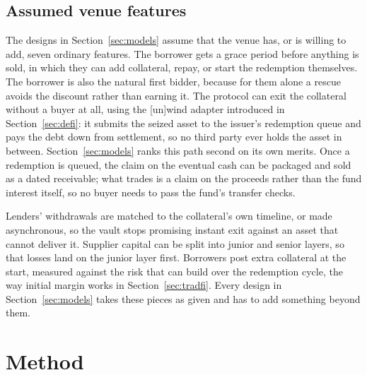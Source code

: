 \documentclass[11pt,a4paper]{article}
\begin{document}
\subsection{Assumed venue features}\label{sec:baseline}

The designs in Section~\ref{sec:models} assume that the venue has, or is willing to add, seven ordinary features. The borrower gets a grace period before anything is sold, in which they can add collateral, repay, or start the redemption themselves. The borrower is also the natural first bidder, because for them alone a rescue avoids the discount rather than earning it. The protocol can exit the collateral without a buyer at all, using the [un]wind adapter introduced in Section~\ref{sec:defi}: it submits the seized asset to the issuer's redemption queue and pays the debt down from settlement, so no third party ever holds the asset in between. Section~\ref{sec:models} ranks this path second on its own merits. Once a redemption is queued, the claim on the eventual cash can be packaged and sold as a dated receivable; what trades is a claim on the proceeds rather than the fund interest itself, so no buyer needs to pass the fund's transfer checks.

Lenders' withdrawals are matched to the collateral's own timeline, or made asynchronous, so the vault stops promising instant exit against an asset that cannot deliver it. Supplier capital can be split into junior and senior layers, so that losses land on the junior layer first. Borrowers post extra collateral at the start, measured against the risk that can build over the redemption cycle, the way initial margin works in Section~\ref{sec:tradfi}. Every design in Section~\ref{sec:models} takes these pieces as given and has to add something beyond them.

\section{Method}\label{sec:method}
\end{document}
